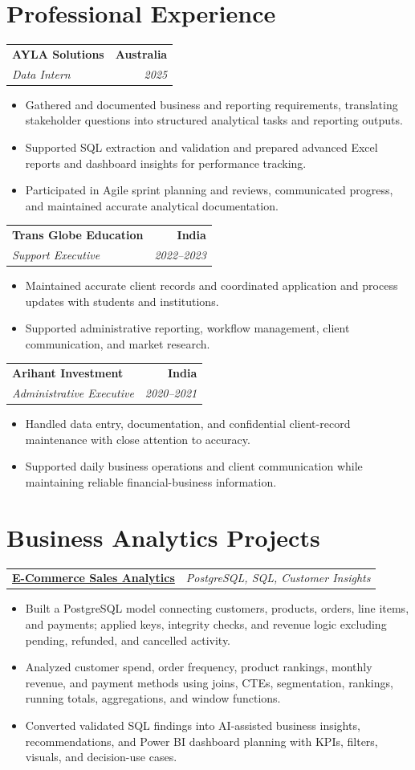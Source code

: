 \documentclass[letterpaper,10pt]{article}
\makeatletter
\newcommand{\role}[4]{%
  \begin{tabularx}{\textwidth}{@{}Xr@{}}
    \textbf{#1} & \textbf{#2} \\
    \textit{#3} & \textit{#4}
  \end{tabularx}\vspace{-1pt}
}
\newcommand{\project}[2]{%
  \begin{tabularx}{\textwidth}{@{}Xr@{}}
    \textbf{#1} & \textit{#2}
  \end{tabularx}\vspace{-1pt}
}
\makeatother
\begin{document}
\section{Professional Experience}
\role{AYLA Solutions}{Australia}{Data Intern}{2025}
\begin{itemize}
  \item Gathered and documented business and reporting requirements, translating stakeholder questions into structured analytical tasks and reporting outputs.
  \item Supported SQL extraction and validation and prepared advanced Excel reports and dashboard insights for performance tracking.
  \item Participated in Agile sprint planning and reviews, communicated progress, and maintained accurate analytical documentation.
\end{itemize}
\vspace{1pt}

\role{Trans Globe Education}{India}{Support Executive}{2022--2023}
\begin{itemize}
  \item Maintained accurate client records and coordinated application and process updates with students and institutions.
  \item Supported administrative reporting, workflow management, client communication, and market research.
\end{itemize}
\vspace{1pt}

\role{Arihant Investment}{India}{Administrative Executive}{2020--2021}
\begin{itemize}
  \item Handled data entry, documentation, and confidential client-record maintenance with close attention to accuracy.
  \item Supported daily business operations and client communication while maintaining reliable financial-business information.
\end{itemize}

\section{Business Analytics Projects}
\project{\href{https://github.com/jainalimehta/Ecommerce-Sales-Analytics}{E-Commerce Sales Analytics}}{PostgreSQL, SQL, Customer Insights}
\begin{itemize}
  \item Built a PostgreSQL model connecting customers, products, orders, line items, and payments; applied keys, integrity checks, and revenue logic excluding pending, refunded, and cancelled activity.
  \item Analyzed customer spend, order frequency, product rankings, monthly revenue, and payment methods using joins, CTEs, segmentation, rankings, running totals, aggregations, and window functions.
  \item Converted validated SQL findings into AI-assisted business insights, recommendations, and Power BI dashboard planning with KPIs, filters, visuals, and decision-use cases.
\end{itemize}
\vspace{1pt}
\end{document}
